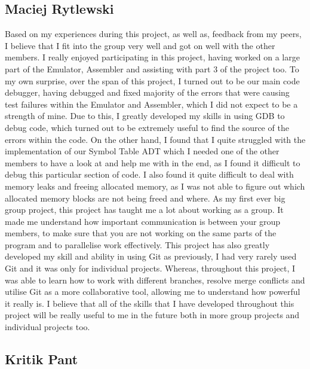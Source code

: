 \documentclass[11pt]{article}
\begin{document}
\subsection{Maciej Rytlewski}

Based on my experiences during this project, as well as, feedback from my peers, I believe that I fit into the group very well and got on well with the other members. I really enjoyed participating 
in this project, having worked on a large part of the Emulator, Assembler and assisting with part 3 of the project too. To my own surprise, over the span of this project, I turned out to be 
our main code debugger, having debugged and fixed majority of the errors that were causing test failures within the Emulator and Assembler, which I did not expect to be a strength of mine. 
Due to this, I greatly developed my skills in using GDB to debug code, which turned out to be extremely useful to find the source of the errors within the code. On the other hand, I found that I quite struggled with 
the implementation of our Symbol Table ADT which I needed one of the other members to have a look at and help me with in the end, as I found it difficult to debug this particular 
section of code. I also found it quite difficult to deal with memory leaks and freeing allocated memory, as I was not able to figure out which allocated memory blocks are not being freed and where.
\newline
As my first ever big group project, this project has taught me a lot about working as a group. It made me understand how important communication is between your group members, to make sure 
that you are not working on the same parts of the program and to parallelise work effectively. This project has also greatly developed my skill and ability in using Git as previously, I had 
very rarely used Git and it was only for individual projects. Whereas, throughout this project, I was able to learn how to work with different branches, resolve merge conflicts and utilise 
Git as a more collaborative tool, allowing me to understand how powerful it really is. I believe that all of the skills that I have developed throughout this project 
will be really useful to me in the future both in more group projects and individual projects too.

\subsection{Kritik Pant}
\end{document}
